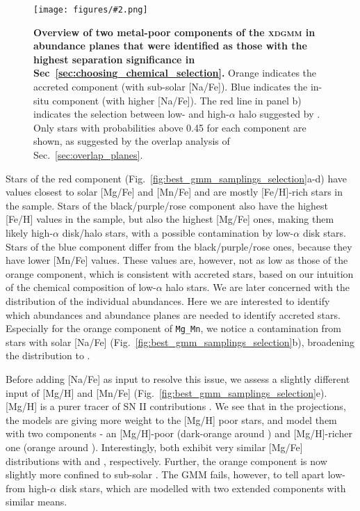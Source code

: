 \documentclass[fleqn,usenatbib]{mnras}
\newcommand{\codeicon}{{\faCloudDownload}}
\newcommand{\codelink}[1]{\href{https://github.com/svenbuder/Accreted-stars-in-GALAH-DR3/tree/main/figures/#1.ipynb}{\codeicon}\,\,}
\newcommand{\oscaption}[2]{\caption{#2 \codelink{#1}}}
\newcommand{\figuretextwidth}[4]{\begin{figure*} \centering \texttt{[image: figures/\#2.png]}\oscaption{#3}{#4}\label{fig:#2} \end{figure*}}
\begin{document}
\figuretextwidth{17cm}{nafe_mgmn_overview}{chronochemodynamic_comparison}{
\textbf{Overview of two metal-poor components of the \textsc{xdgmm} in abundance planes that were identified as those with the highest separation significance in Sec~\ref{sec:choosing_chemical_selection}.}
Orange indicates the accreted component (with sub-solar [Na/Fe]).
Blue indicates the in-situ component (with higher [Na/Fe]).
The red line in panel b) indicates the selection between low- and high-$\alpha$ halo suggested by \citet{Nissen2010}.
Only stars with probabilities above 0.45 for each component are shown, as suggested by the overlap analysis of Sec.~\ref{sec:overlap_planes}.
}

Stars of the red component (Fig.~\ref{fig:best_gmm_samplings_selection}a-d) have values closest to solar [Mg/Fe] and [Mn/Fe] and are mostly [Fe/H]-rich stars in the sample. Stars of the black/purple/rose component also have the highest [Fe/H] values in the sample, but also the highest [Mg/Fe] ones, making them likely high-$\alpha$ disk/halo stars, with a possible contamination by low-$\alpha$ disk stars. Stars of the blue component differ from the black/purple/rose ones, because they have lower [Mn/Fe] values. These values are, however, not as low as those of the orange component, which is consistent with accreted stars, based on our intuition of the chemical composition of low-$\alpha$ halo stars. We are later concerned with the distribution of the individual abundances. Here we are interested to identify which abundances and abundance planes are needed to identify accreted stars. Especially for the orange component of \texttt{Mg\_Mn}, we notice a contamination from stars with solar [Na/Fe] (Fig.~\ref{fig:best_gmm_samplings_selection}b), broadening the distribution to .

Before adding [Na/Fe] as input to resolve this issue, we assess a slightly different input of [Mg/H] and [Mn/Fe] (Fig.~\ref{fig:best_gmm_samplings_selection}e). [Mg/H] is a purer tracer of SN II contributions \citep{Kobayashi2020, Feuillet2021}. We see that in the projections, the models are giving more weight to the [Mg/H] poor stars, and model them with two components - an [Mg/H]-poor (dark-orange around ) and [Mg/H]-richer one (orange around ). Interestingly, both exhibit very similar [Mg/Fe] distributions with  and , respectively. Further, the orange component is now slightly more confined to sub-solar . The GMM fails, however, to tell apart low- from high-$\alpha$ disk stars, which are modelled with two extended components with similar means.
\end{document}
